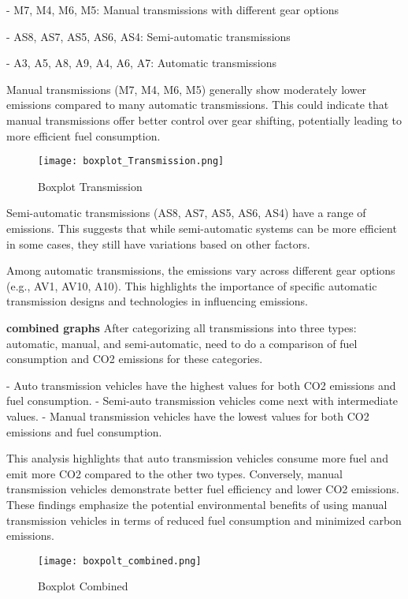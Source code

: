 \documentclass[12pt, a4paper,oneside]{book}
\numberwithin{equation}{section}
\begin{document}
-	M7, M4, M6, M5: Manual transmissions with different gear options

-	AS8, AS7, AS5, AS6, AS4: Semi-automatic transmissions

-	A3, A5, A8, A9, A4, A6, A7: Automatic transmissions

Manual transmissions (M7, M4, M6, M5) generally show moderately lower emissions compared to many automatic transmissions. This could indicate that manual transmissions offer better control over gear shifting, potentially leading to more efficient fuel consumption.




 \begin{figure}[H]
\centerline{\texttt{[image: boxplot\_Transmission.png]}}
\caption{Boxplot Transmission}
\label{fig:4.2}
\end{figure}

\newpage
Semi-automatic transmissions (AS8, AS7, AS5, AS6, AS4) have a range of emissions. This suggests that while semi-automatic systems can be more efficient in some cases, they still have variations based on other factors.

Among automatic transmissions, the emissions vary across different gear options (e.g., AV1, AV10, A10). This highlights the importance of specific automatic transmission designs and technologies in influencing emissions.

\textbf{ combined graphs}
After categorizing all transmissions into three types: automatic, manual, and semi-automatic, need to do a comparison of fuel consumption and CO2 emissions for these categories.

- Auto transmission vehicles have the highest values for both CO2 emissions and fuel consumption.
- Semi-auto transmission vehicles come next with intermediate values.
- Manual transmission vehicles have the lowest values for both CO2 emissions and fuel consumption.

This analysis highlights that auto transmission vehicles consume more fuel and emit more CO2 compared to the other two types. Conversely, manual transmission vehicles demonstrate better fuel efficiency and lower CO2 emissions. These findings emphasize the potential environmental benefits of using manual transmission vehicles in terms of reduced fuel consumption and minimized carbon emissions.

 \begin{figure}[H]
\centerline{\texttt{[image: boxpolt\_combined.png]}}
\caption{Boxplot Combined}
\label{fig:4.2}
\end{figure}
\end{document}

